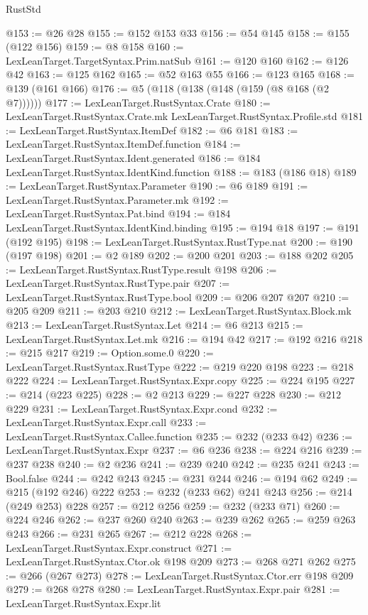 \begin{lexlean}{RustStd}
\begin{coremodule}
{\begin{coremodule}
{{{{{{{{{@153 := @26 @28
@155 := @152 @153 @33
@156 := @54 @145
@158 := @155 (@122 @156)
@159 := @8 @158
@160 := LexLeanTarget.TargetSyntax.Prim.natSub
@161 := @120 @160
@162 := @126 @42
@163 := @125 @162
@165 := @52 @163 @55
@166 := @123 @165
@168 := @139 (@161 @166)
@176 := @5 (@118 (@138 (@148 (@159 (@8 @168 (@2 @7))))))
@177 := LexLeanTarget.RustSyntax.Crate
@180 := LexLeanTarget.RustSyntax.Crate.mk LexLeanTarget.RustSyntax.Profile.std
@181 := LexLeanTarget.RustSyntax.ItemDef
@182 := @6 @181
@183 := LexLeanTarget.RustSyntax.ItemDef.function
@184 := LexLeanTarget.RustSyntax.Ident.generated
@186 := @184 LexLeanTarget.RustSyntax.IdentKind.function
@188 := @183 (@186 @18)
@189 := LexLeanTarget.RustSyntax.Parameter
@190 := @6 @189
@191 := LexLeanTarget.RustSyntax.Parameter.mk
@192 := LexLeanTarget.RustSyntax.Pat.bind
@194 := @184 LexLeanTarget.RustSyntax.IdentKind.binding
@195 := @194 @18
@197 := @191 (@192 @195)
@198 := LexLeanTarget.RustSyntax.RustType.nat
@200 := @190 (@197 @198)
@201 := @2 @189
@202 := @200 @201
@203 := @188 @202
@205 := LexLeanTarget.RustSyntax.RustType.result @198
@206 := LexLeanTarget.RustSyntax.RustType.pair
@207 := LexLeanTarget.RustSyntax.RustType.bool
@209 := @206 @207 @207
@210 := @205 @209
@211 := @203 @210
@212 := LexLeanTarget.RustSyntax.Block.mk
@213 := LexLeanTarget.RustSyntax.Let
@214 := @6 @213
@215 := LexLeanTarget.RustSyntax.Let.mk
@216 := @194 @42
@217 := @192 @216
@218 := @215 @217
@219 := Option.some.{0}
@220 := LexLeanTarget.RustSyntax.RustType
@222 := @219 @220 @198
@223 := @218 @222
@224 := LexLeanTarget.RustSyntax.Expr.copy
@225 := @224 @195
@227 := @214 (@223 @225)
@228 := @2 @213
@229 := @227 @228
@230 := @212 @229
@231 := LexLeanTarget.RustSyntax.Expr.cond
@232 := LexLeanTarget.RustSyntax.Expr.call
@233 := LexLeanTarget.RustSyntax.Callee.function
@235 := @232 (@233 @42)
@236 := LexLeanTarget.RustSyntax.Expr
@237 := @6 @236
@238 := @224 @216
@239 := @237 @238
@240 := @2 @236
@241 := @239 @240
@242 := @235 @241
@243 := Bool.false
@244 := @242 @243
@245 := @231 @244
@246 := @194 @62
@249 := @215 (@192 @246) @222
@253 := @232 (@233 @62) @241 @243
@256 := @214 (@249 @253) @228
@257 := @212 @256
@259 := @232 (@233 @71)
@260 := @224 @246
@262 := @237 @260 @240
@263 := @239 @262
@265 := @259 @263 @243
@266 := @231 @265
@267 := @212 @228
@268 := LexLeanTarget.RustSyntax.Expr.construct
@271 := LexLeanTarget.RustSyntax.Ctor.ok @198 @209
@273 := @268 @271 @262
@275 := @266 (@267 @273)
@278 := LexLeanTarget.RustSyntax.Ctor.err @198 @209
@279 := @268 @278
@280 := LexLeanTarget.RustSyntax.Expr.pair
@281 := LexLeanTarget.RustSyntax.Expr.lit
}}}}}}}}}
\end{coremodule}}
\end{coremodule}
\end{lexlean}
